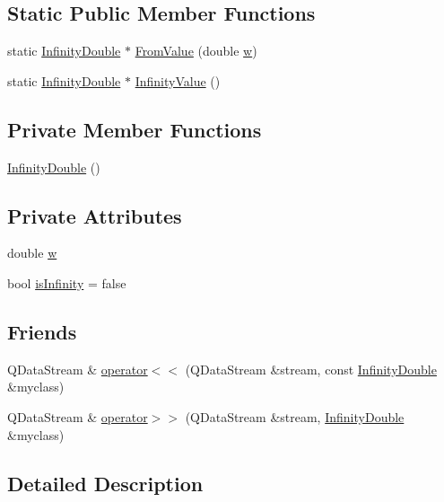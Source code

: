 \subsection*{Static Public Member Functions}
\begin{DoxyCompactItemize}
\item 
static \hyperlink{a00161}{Infinity\+Double} $\ast$ \hyperlink{a00161_adb0a2fa93aa5f90a93c3f4303436913a}{From\+Value} (double \hyperlink{a00161_a41b95322310121af834ac42159fff654}{w})
\item 
static \hyperlink{a00161}{Infinity\+Double} $\ast$ \hyperlink{a00161_a67fae871f96708313bedc644630ac8bc}{Infinity\+Value} ()
\end{DoxyCompactItemize}
\subsection*{Private Member Functions}
\begin{DoxyCompactItemize}
\item 
\hyperlink{a00161_a8d33637f68b523cf2b21abd1509c47bf}{Infinity\+Double} ()
\end{DoxyCompactItemize}
\subsection*{Private Attributes}
\begin{DoxyCompactItemize}
\item 
double \hyperlink{a00161_a41b95322310121af834ac42159fff654}{w}
\item 
bool \hyperlink{a00161_a435ef98a3b05725db8c963f7f41e32ef}{is\+Infinity} = false
\end{DoxyCompactItemize}
\subsection*{Friends}
\begin{DoxyCompactItemize}
\item 
Q\+Data\+Stream \& \hyperlink{a00161_ac679f673051abba09b475da2f8aff522}{operator$<$$<$} (Q\+Data\+Stream \&stream, const \hyperlink{a00161}{Infinity\+Double} \&myclass)
\item 
Q\+Data\+Stream \& \hyperlink{a00161_a6ccd429a9269b6aeb8d45f3579caf3b0}{operator$>$$>$} (Q\+Data\+Stream \&stream, \hyperlink{a00161}{Infinity\+Double} \&myclass)
\end{DoxyCompactItemize}


\subsection{Detailed Description}


